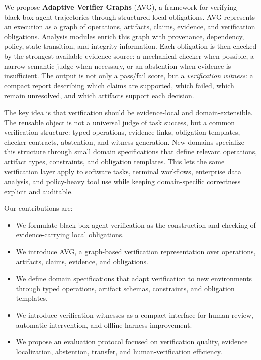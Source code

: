 \documentclass{article} %
\newcommand{\AVG}{\textsc{AVG}\xspace}
\begin{document}
We propose \textbf{Adaptive Verifier Graphs} (\AVG), a framework for verifying black-box agent trajectories through structured local obligations. \AVG represents an execution as a graph of operations, artifacts, claims, evidence, and verification obligations. Analysis modules enrich this graph with provenance, dependency, policy, state-transition, and integrity information. Each obligation is then checked by the strongest available evidence source: a mechanical checker when possible, a narrow semantic judge when necessary, or an abstention when evidence is insufficient. The output is not only a pass/fail score, but a \emph{verification witness}: a compact report describing which claims are supported, which failed, which remain unresolved, and which artifacts support each decision.

The key idea is that verification should be evidence-local and domain-extensible. The reusable object is not a universal judge of task success, but a common verification structure: typed operations, evidence links, obligation templates, checker contracts, abstention, and witness generation. New domains specialize this structure through small domain specifications that define relevant operations, artifact types, constraints, and obligation templates. This lets the same verification layer apply to software tasks, terminal workflows, enterprise data analysis, and policy-heavy tool use while keeping domain-specific correctness explicit and auditable.

Our contributions are:
\begin{itemize}[leftmargin=1.2em]
\item We formulate black-box agent verification as the construction and checking of evidence-carrying local obligations.
\item We introduce \AVG, a graph-based verification representation over operations, artifacts, claims, evidence, and obligations.
\item We define domain specifications that adapt verification to new environments through typed operations, artifact schemas, constraints, and obligation templates.
\item We introduce verification witnesses as a compact interface for human review, automatic intervention, and offline harness improvement.
\item We propose an evaluation protocol focused on verification quality, evidence localization, abstention, transfer, and human-verification efficiency.
\end{itemize}
\end{document}
